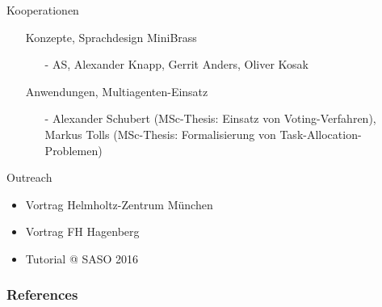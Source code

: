\documentclass[handout,10pt,xcolor={dvipsnames},fleqn]{beamer}
\begin{document}
\begin{frame}{Kooperationen}
\begin{itemize}
\item[] \alert{Konzepte, Sprachdesign MiniBrass}
\begin{itemize}
\item[-] AS, Alexander Knapp, Gerrit Anders, Oliver Kosak
\end{itemize}
\item[] \alert{Anwendungen, Multiagenten-Einsatz}
\begin{itemize}
\item[-] Alexander Schubert (MSc-Thesis: Einsatz von Voting-Verfahren), Markus Tolls (MSc-Thesis: Formalisierung von Task-Allocation-Problemen)
\end{itemize}
\end{itemize}
\end{frame}

\begin{frame}{Outreach}
\begin{itemize}
\item Vortrag Helmholtz-Zentrum München
\item Vortrag FH Hagenberg
\item Tutorial @ SASO 2016
\end{itemize}
\end{frame}



\begin{frame}[allowframebreaks]
        \frametitle{References}
        
        
\end{frame}
\end{document}
